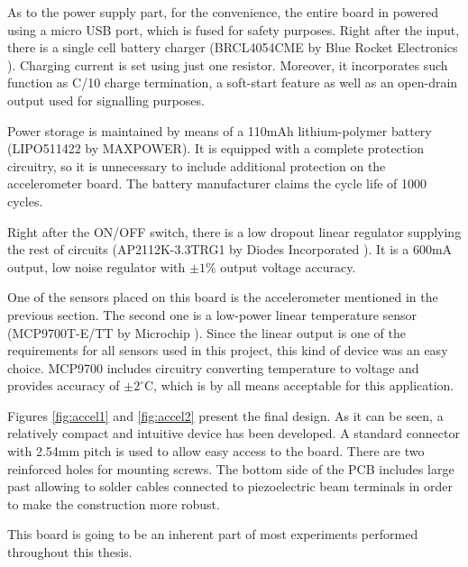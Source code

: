 \documentclass[12pt,a4paper]{article}
\begin{document}
As to the power supply part, for the convenience, the entire board in powered using a micro USB port, which is fused for safety purposes. Right after the input, there is a single cell battery charger (BRCL4054CME by Blue Rocket Electronics \cite{charger_params}). Charging current is set using just one resistor. Moreover, it incorporates such function as C/10 charge termination, a soft-start feature as well as an open-drain output used for signalling purposes.
\par
Power storage is maintained by means of a 110mAh lithium-polymer battery (LIPO511422 by MAXPOWER). It is equipped with a complete protection circuitry, so it is unnecessary to include additional protection on the accelerometer board. The battery manufacturer claims the cycle life of 1000 cycles.
\par

Right after the ON/OFF switch, there is a low dropout linear regulator supplying the rest of circuits (AP2112K-3.3TRG1 by Diodes Incorporated \cite{ap2112_params}). It is a 600mA output, low noise regulator with $\pm{1}\%$ output voltage accuracy.
\par

One of the sensors placed on this board is the accelerometer mentioned in the previous section. The second one is a low-power linear temperature sensor (MCP9700T-E/TT by Microchip \cite{mcp9700_params}). Since the linear output is one of the requirements for all sensors used in this project, this kind of device was an easy choice. MCP9700 includes circuitry converting temperature to voltage and provides accuracy of $\pm{2}^\circ $C, which is by all means acceptable for this application.
\par

Figures \ref{fig:accel1} and \ref{fig:accel2} present the final design. As it can be seen, a relatively compact and intuitive device has been developed. A standard connector with 2.54mm pitch is used to allow easy access to the board. There are two reinforced holes for mounting screws. The bottom side of the PCB includes large past allowing to solder cables connected to piezoelectric beam terminals in order to make the construction more robust.
\par

This board is going to be an inherent part of most experiments performed throughout this thesis.
\end{document}
